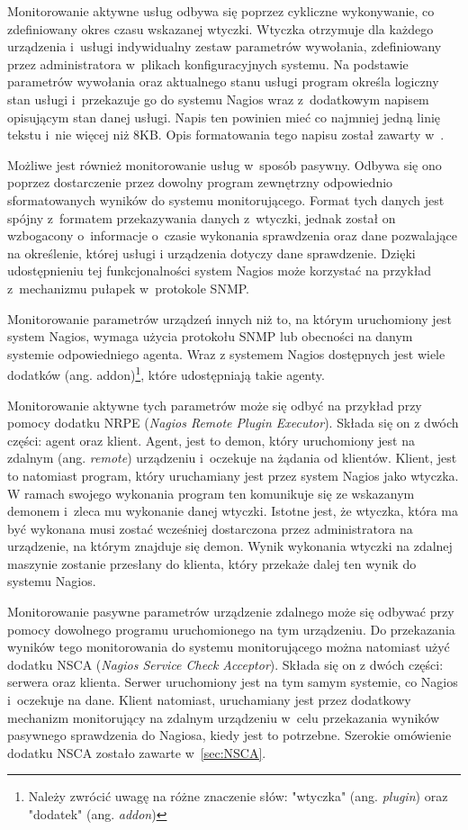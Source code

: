 Monitorowanie aktywne usług odbywa się poprzez cykliczne wykonywanie,
co zdefiniowany okres czasu wskazanej wtyczki. Wtyczka otrzymuje dla
każdego urządzenia i~usługi indywidualny zestaw parametrów wywołania,
zdefiniowany przez administratora w~plikach konfiguracyjnych
systemu. Na podstawie parametrów wywołania oraz aktualnego stanu
usługi program określa logiczny stan usługi i~przekazuje go do systemu
Nagios wraz z~dodatkowym napisem opisującym stan danej usługi. Napis
ten powinien mieć co najmniej jedną linię tekstu i~nie więcej niż
8KB. Opis formatowania tego napisu został zawarty
w~\cite{www:NagiosPluginsTutorial}. 

Możliwe jest również monitorowanie usług w~sposób pasywny. Odbywa się
ono poprzez dostarczenie przez dowolny program zewnętrzny odpowiednio
sformatowanych wyników do systemu monitorującego. Format tych danych
jest spójny z~formatem przekazywania danych z~wtyczki, jednak został
on wzbogacony o~informacje o~czasie wykonania sprawdzenia oraz dane
pozwalające na określenie, której usługi i urządzenia dotyczy dane
sprawdzenie. Dzięki udostępnieniu tej funkcjonalności system Nagios
może korzystać na przykład z~mechanizmu pułapek w~protokole SNMP.

Monitorowanie parametrów urządzeń innych niż to, na którym uruchomiony
jest system Nagios, wymaga użycia protokołu SNMP lub obecności na
danym systemie odpowiedniego agenta. Wraz z systemem Nagios dostępnych
jest wiele dodatków (ang. addon)\footnote{Należy zwrócić uwagę na
  różne znaczenie słów: "wtyczka" (ang. {\em plugin}) oraz "dodatek"
  (ang. {\em addon})}, które udostępniają takie agenty.

Monitorowanie aktywne tych parametrów może się odbyć na przykład przy
pomocy dodatku NRPE ({\em Nagios Remote Plugin Executor}). Składa się
on z dwóch części: agent oraz klient. Agent, jest to demon, który
uruchomiony jest na zdalnym (ang. {\em remote}) urządzeniu i~oczekuje
na żądania od klientów. Klient, jest to natomiast program, który
uruchamiany jest przez system Nagios jako wtyczka. W ramach swojego
wykonania program ten komunikuje się ze wskazanym demonem i~zleca mu
wykonanie danej wtyczki. Istotne jest, że wtyczka, która ma być
wykonana musi zostać wcześniej dostarczona przez administratora na
urządzenie, na którym znajduje się demon. Wynik wykonania wtyczki na
zdalnej maszynie zostanie przesłany do klienta, który przekaże dalej
ten wynik do systemu Nagios.

Monitorowanie pasywne parametrów urządzenie zdalnego może się odbywać
przy pomocy dowolnego programu uruchomionego na tym urządzeniu. Do
przekazania wyników tego monitorowania do systemu monitorującego można
natomiast użyć dodatku NSCA ({\em Nagios Service Check
  Acceptor}). Składa się on z dwóch części: serwera oraz
klienta. Serwer uruchomiony jest na tym samym systemie, co Nagios
i~oczekuje na dane. Klient natomiast, uruchamiany jest przez dodatkowy
mechanizm monitorujący na zdalnym urządzeniu w~celu przekazania
wyników pasywnego sprawdzenia do Nagiosa, kiedy jest to
potrzebne. Szerokie omówienie dodatku NSCA zostało zawarte
w~\ref{sec:NSCA}.

